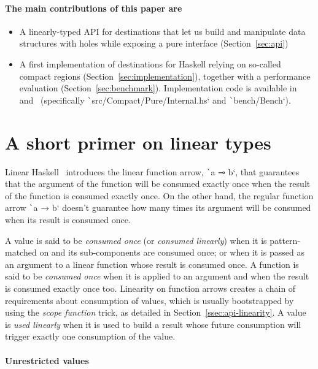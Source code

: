 \documentclass[english]{jflart}
\begin{document}
\paragraph{The main contributions of this paper are}
\begin{itemize}
\item A linearly-typed API for destinations that let us build and manipulate data structures with holes while exposing a pure interface (Section~\ref{sec:api})
\item A first implementation of destinations for Haskell relying on so-called compact regions (Section~\ref{sec:implementation}), together with a performance evaluation (Section~\ref{sec:benchmark}). Implementation code is available in~\cite{custom_ghc} and~\cite{linear_dest} (specifically \texttt`src/Compact/Pure/Internal.hs` and \texttt`bench/Bench`).
\end{itemize}

\section{A short primer on linear types}\label{sec:intro-linearity}

Linear Haskell~\cite{bernardy_linear_2018} introduces the linear function arrow, \texttt`a ⊸ b`, that guarantees that the argument of the function will be consumed exactly once when the result of the function is consumed exactly once. On the other hand, the regular function arrow \texttt`a → b` doesn't guarantee how many times its argument will be consumed when its result is consumed once.

A value is said to be \emph{consumed once} (or \emph{consumed linearly}) when it is pattern-matched on and its sub-components are consumed once; or when it is passed as an argument to a linear function whose result is consumed once. A function is said to be \emph{consumed once} when it is applied to an argument and when the result is consumed exactly once too. Linearity on function arrows creates a chain of requirements about consumption of values, which is usually bootstrapped by using the \emph{scope function} trick, as detailed in Section~\ref{ssec:api-linearity}. A value is \emph{used linearly} when it is used to build a result whose future consumption will trigger exactly one consumption of the value.

\paragraph{Unrestricted values}
\end{document}
